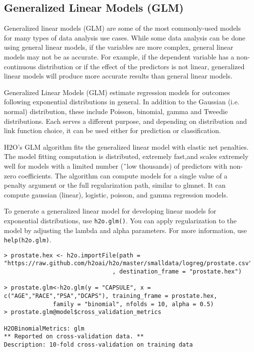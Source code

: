 {\subsection{Generalized Linear Models (GLM)}


Generalized linear models (GLM) are some of the most commonly-used models for many types of data analysis use cases. While some data analysis can be done using general linear models, if the variables are more complex, general linear models may not be as accurate. For example, if the dependent variable has a non-continuous distribution or if the effect of the predictors is not linear, generalized linear models will produce more accurate results than general linear models.  

Generalized Linear Models (GLM) estimate regression models for outcomes following exponential distributions in general. In addition to the Gaussian (i.e. normal) distribution, these include Poisson, binomial, gamma and Tweedie distributions. Each serves a different purpose, and depending on distribution and link function choice, it can be used either for prediction or classification.

H2O's GLM algorithm fits the generalized linear model with elastic net penalties. The model fitting computation is distributed, extremely fast,and scales extremely well for models with a limited number (\~\ low thousands) of predictors with non-zero coefficients. The algorithm can compute models for a single value of a penalty argument or the full regularization path, similar to glmnet. It can compute gaussian (linear), logistic, poisson, and gamma regression models.


To generate a generalized linear model for developing linear models for exponential distributions, use {\texttt{h2o.glm()}}. You can apply regularization to the model by adjusting the lambda and alpha parameters. 
For more information, use {\texttt{help(h2o.glm)}}.
\smallskip
\begin{lstlisting}[style=R]
> prostate.hex <- h2o.importFile(path = "https://raw.github.com/h2oai/h2o/master/smalldata/logreg/prostate.csv"
                               , destination_frame = "prostate.hex")

> prostate.glm<-h2o.glm(y = "CAPSULE", x = c("AGE","RACE","PSA","DCAPS"), training_frame = prostate.hex,
              family = "binomial", nfolds = 10, alpha = 0.5)
> prostate.glm@model$cross_validation_metrics

H2OBinomialMetrics: glm
** Reported on cross-validation data. **
Description: 10-fold cross-validation on training data


\end{lstlisting}}
